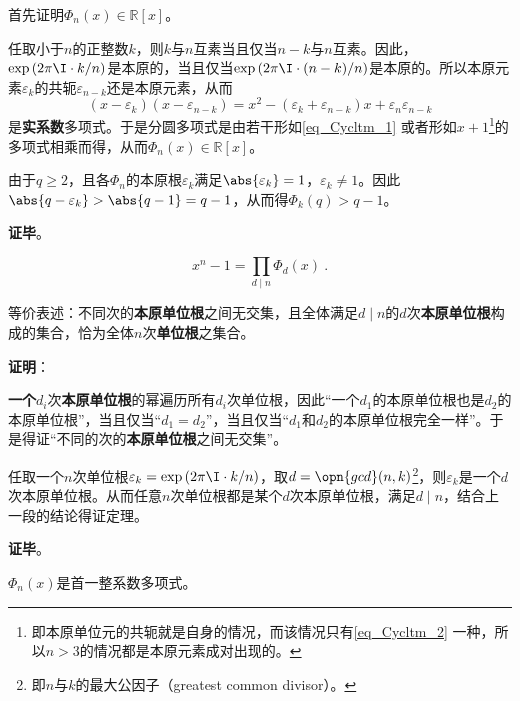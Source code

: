 首先证明$\Phi_n(x)\in\mathbb{R}[x]$。

任取小于$n$的正整数$k$，则$k$与$n$互素当且仅当$n-k$与$n$互素。因此，$\exp{(2\pi\I\cdot  k/n)}$是本原的，当且仅当$\exp{(2\pi\I\cdot  (n-k)/n)}$是本原的。所以本原元素$\varepsilon_k$的共轭$\varepsilon_{n-k}$还是本原元素，从而
\begin{equation}\label{eq_Cycltm_1}
(x-\varepsilon_k)(x-\varepsilon_{n-k})=x^2-(\varepsilon_k+\varepsilon_{n-k})x+\varepsilon_n\varepsilon_{n-k}
\end{equation}
是\textbf{实系数}多项式。于是分圆多项式是由若干形如\autoref{eq_Cycltm_1} 或者形如$x+1$\footnote{即本原单位元的共轭就是自身的情况，而该情况只有\autoref{eq_Cycltm_2} 一种，所以$n>3$的情况都是本原元素成对出现的。}的多项式相乘而得，从而$\Phi_n(x)\in\mathbb{R}[x]$。

由于$q\geq 2$，且各$\Phi_n$的本原根$\varepsilon_k$满足$\abs{\varepsilon_k}=1$，$\varepsilon_k\neq 1$。因此$\abs{q-\varepsilon_k}>\abs{q-1}=q-1$，从而得$\Phi_k(q)>q-1$。


\textbf{证毕}。




\begin{theorem}{}\label{the_Cycltm_1}
\begin{equation}
x^n-1 = \prod_{d\mid n}\Phi_d(x)~.
\end{equation}

等价表述：不同次的\textbf{本原单位根}之间无交集，且全体满足$d\mid n$的$d$次\textbf{本原单位根}构成的集合，恰为全体$n$次\textbf{单位根}之集合。
\end{theorem}

\textbf{证明}：

\textbf{一个}$d_i$次\textbf{本原单位根}的幂遍历所有$d_i$次单位根，因此“一个$d_1$的本原单位根也是$d_2$的本原单位根”，当且仅当“$d_1=d_2$”，当且仅当“$d_1$和$d_2$的本原单位根完全一样”。于是得证“不同的次的\textbf{本原单位根}之间无交集”。

任取一个$n$次单位根$\varepsilon_k=\exp{(2\pi\I\cdot  k/n)}$，取$d=\opn{gcd}(n, k)$\footnote{即$n$与$k$的最大公因子（greatest common divisor）。}，则$\varepsilon_k$是一个$d$次本原单位根。从而任意$n$次单位根都是某个$d$次本原单位根，满足$d\mid n$，结合上一段的结论得证定理。

\textbf{证毕}。



\begin{theorem}{}\label{the_Cycltm_2}
$\Phi_n(x)$是首一整系数多项式。
\end{theorem}

